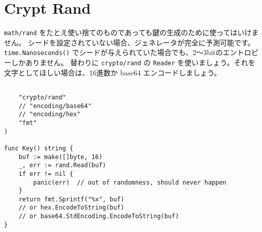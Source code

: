 \section{Crypt Rand}

\texttt{math/rand} をたとえ使い捨てのものであっても鍵の生成のために使ってはいけません。 シードを設定されていない場合、ジェネレータが完全に予測可能です。 \texttt{time.Nanoseconds()} でシードが与えられていた場合でも、2〜3bitのエントロピーしかありません。 替わりに \texttt{crypto/rand} の \texttt{Reader} を使いましょう。それを文字としてほしい場合は、16進数か base64 エンコードしましょう。


\begin{lstlisting}[]

    "crypto/rand"
    // "encoding/base64"
    // "encoding/hex"
    "fmt"
)

func Key() string {
    buf := make([]byte, 16)
    _, err := rand.Read(buf)
    if err != nil {
        panic(err)  // out of randomness, should never happen
    }
    return fmt.Sprintf("%x", buf)
    // or hex.EncodeToString(buf)
    // or base64.StdEncoding.EncodeToString(buf)
}
\end{lstlisting}



